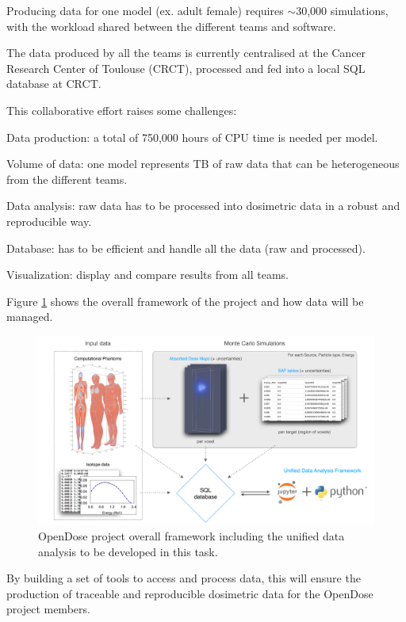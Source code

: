   Producing data for one model (ex. adult female) requires $\sim$30,000
  simulations, with the workload shared between the different teams and
  software.

  The data produced by all the teams is currently centralised at the Cancer
  Research Center of Toulouse (CRCT), processed and fed into a local SQL
  database at CRCT.

  This collaborative effort raises some challenges:
  \begin{compactitem}
  \item Data production: a total of 750,000 hours of CPU time is needed per
    model.
  \item Volume of data: one model represents TB of raw data that can be
    heterogeneous from the different teams.
  \item Data analysis: raw data has to be processed into dosimetric data in a
    robust and reproducible way.
  \item Database: has to be efficient and handle all the data (raw and
    processed).
  \item Visualization: display and compare results from all teams.
  \end{compactitem}

Figure
  \ref{fig:opendose_framework} shows the overall framework of the project and
  how data will be managed.

  \begin{figure}[t!]
    \centering
    \includegraphics[width=1.0\textwidth]{images/opendose_framework.pdf}
    \caption{OpenDose project overall framework including the unified data
    analysis to be developed in this task.}
    \label{fig:opendose_framework}
  \end{figure}

  By building a set of tools to access and process data, this will ensure the
  production of traceable and reproducible dosimetric data for the OpenDose
  project members.

